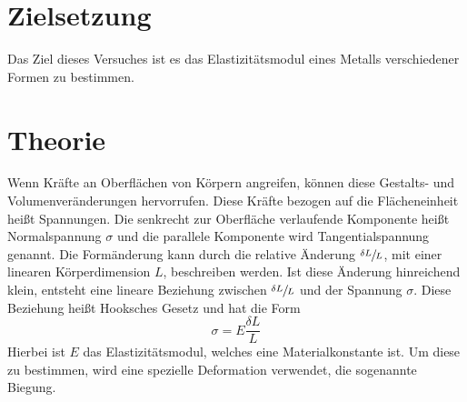 \section{Zielsetzung}
Das Ziel dieses Versuches ist es das Elastizitätsmodul eines Metalls verschiedener Formen zu bestimmen.

\section{Theorie}
\label{sec:Theorie}

Wenn Kräfte an Oberflächen von Körpern angreifen, können diese Gestalts- und Volumenveränderungen hervorrufen.
Diese Kräfte bezogen auf die Flächeneinheit heißt Spannungen.
Die senkrecht zur Oberfläche verlaufende Komponente heißt Normalspannung $\sigma$ und die parallele Komponente wird Tangentialspannung genannt.
Die Formänderung kann durch die relative Änderung $\sfrac{\delta L }{L}$, mit einer linearen Körperdimension $L$, beschreiben werden.
Ist diese Änderung hinreichend klein, entsteht eine lineare Beziehung zwischen $\sfrac{\delta L }{L}$ und der Spannung $\sigma$.
Diese Beziehung heißt Hooksches Gesetz und hat die Form
\begin{equation*}
    \sigma = E \frac{\delta L}{L}
\end{equation*}
Hierbei ist $E$ das Elastizitätsmodul, welches eine Materialkonstante ist.
Um diese zu bestimmen, wird eine spezielle Deformation verwendet, die sogenannte Biegung.

